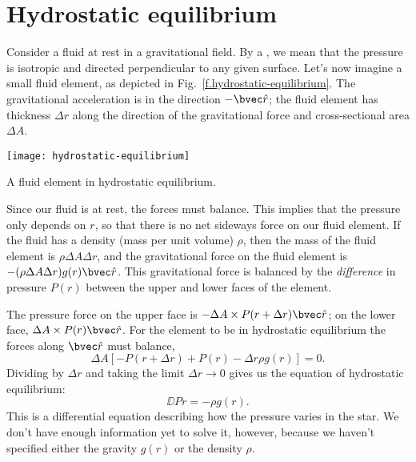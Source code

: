 
\section{Hydrostatic equilibrium}
\label{s.hydrostatic-equilibrium}


Consider a fluid at rest in a gravitational field. By a , we mean that the pressure is isotropic and directed perpendicular to any given surface. Let's now imagine a small fluid element, as depicted in Fig.~\ref{f.hydrostatic-equilibrium}. The gravitational acceleration is in the direction $-\unitvector{r}$; the fluid element has thickness $\Delta r$ along the direction of the gravitational force and cross-sectional area $\Delta A$.
\begin{marginfigure}
\texttt{[image: hydrostatic-equilibrium]}
\caption[A fluid element in hydrostatic equilibrium]{A fluid element in hydrostatic equilibrium.
\label{f.hydrostatic-equilibrium}}
\end{marginfigure}

Since our fluid is at rest, the forces must balance. This implies that the pressure only depends on $r$, so that there is no net sideways force on our fluid element. If the fluid has a density (mass per unit volume) $\rho$, then the mass of the fluid element is $\rho\Delta A\Delta r$, and the gravitational force on the fluid element is $-(\rho\Delta A \Delta r) g(r) \unitvector{r}$. This gravitational force is balanced by the \emph{difference} in pressure $P(r)$ between the upper and lower faces of the element.

The pressure force on the upper face is $-\Delta A\times P(r+\Delta r)\unitvector{r}$; on the lower face, $\Delta A\times P(r)\unitvector{r}$. For the element to be in hydrostatic equilibrium the forces along $\unitvector{r}$ must balance,
\[
        \Delta A \left[ -P(r+\Delta r) + P(r) - \Delta r \rho g(r)  \right] = 0.
\]
Dividing by $\Delta r$ and taking the limit $\Delta r \to 0$ gives us the equation of hydrostatic equilibrium:
\begin{equation}\label{e.hydrostatic-equilibrium-g}
        \DD{P}{r} = -\rho g(r).
\end{equation}
This is a differential equation describing how the pressure varies in the star. We don't have enough information yet to solve it, however, because we haven't specified either the gravity $g(r)$ or the density $\rho$.

